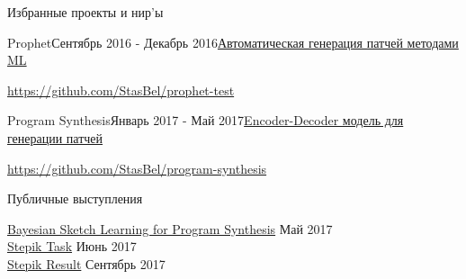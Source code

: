\documentclass{resume} %
\begin{document}

\begin{rSection}{Избранные проекты и нир'ы} \itemsep -3pt  

\begin{rSubsection}{Prophet}{Сентябрь 2016 - Декабрь 2016}{\href{https://drive.google.com/file/d/0B6udzTbX1EFPTFZMSS1RVUVvXzg/view?usp=sharing}{Автоматическая генерация патчей методами ML}}{}
\item[] \url{https://github.com/StasBel/prophet-test}
\end{rSubsection}

\begin{rSubsection}{Program Synthesis}{Январь 2017 - Май 2017}{\href{https://docs.google.com/presentation/d/113EFcW8L7p8ickhfMoht8ivOomq2fRPizLtWSH9cSX4/pub?start=false&loop=false&delayms=3000}{Encoder-Decoder модель для генерации патчей}}{}
\item[] \url{https://github.com/StasBel/program-synthesis}
\end{rSubsection}

\end{rSection}


\begin{rSection}{Публичные выступления} \itemsep -3pt  

{\href{https://docs.google.com/presentation/d/1ieE0JZWKbCQH_qpH81M1pSbUSARBP7DKLdGVwk563pM/pub?start=false&loop=false&delayms=3000}{Bayesian Sketch Learning for Program Synthesis}} \hfill Май 2017 \\ 
{\href{https://docs.google.com/presentation/d/19FyHBksjffXY6nF1B1xRvkkW-lSp0QIPzU_o-h5RD00/pub?start=false&loop=false&delayms=3000}{Stepik Task}} \hfill Июнь 2017 \\
{\href{https://docs.google.com/presentation/d/e/2PACX-1vSooVyWYFG1swzqGyjLB7dYQ9sLMzzg_s-GqHXBTOw21FyBzhWBtI73wAZlr5lATY5iqEstFBe--Opc/pub?start=false&loop=false&delayms=3000}{Stepik Result}} \hfill Сентябрь 2017 \\
\end{rSection} 

\end{document}
